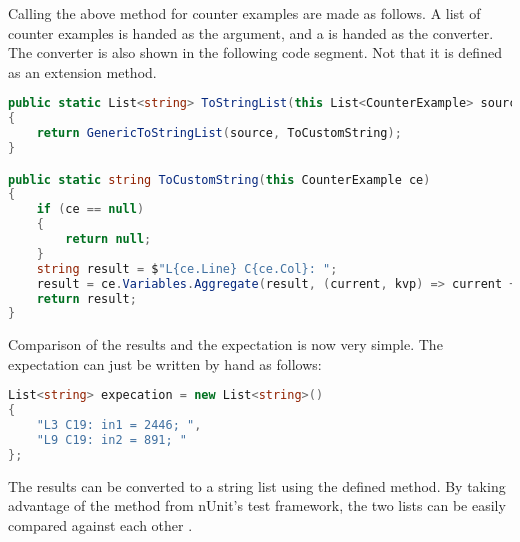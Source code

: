 Calling the above method for counter examples are made as follows.
A list of counter examples is handed as the argument, and a  is handed as the converter.
The converter is also shown in the following code segment.
Not that it is defined as an extension method.

\begin{lstlisting}[language=csharp, caption={Converting CounterExamples to strings}, captionpos=b, label={lst:converterCEToString}]
public static List<string> ToStringList(this List<CounterExample> source)
{
    return GenericToStringList(source, ToCustomString);
}

public static string ToCustomString(this CounterExample ce)
{
    if (ce == null)
    {
        return null;
    }
    string result = $"L{ce.Line} C{ce.Col}: ";
    result = ce.Variables.Aggregate(result, (current, kvp) => current + $"{kvp.Key} = {kvp.Value}; ");
    return result;
}
\end{lstlisting}

Comparison of the results and the expectation is now very simple.
The expectation can just be written by hand as follows:

\begin{lstlisting}[language=csharp, caption={Expectation}, captionpos=b, label={lst:testexpectation}]
List<string> expecation = new List<string>()
{
    "L3 C19: in1 = 2446; ",
    "L9 C19: in2 = 891; "
};
\end{lstlisting}

The results can be converted to a string list using the defined  method.
By taking advantage of the method  from nUnit's test framework, the two lists can be easily compared against each other \cite{nunitCollectionAssert}.

